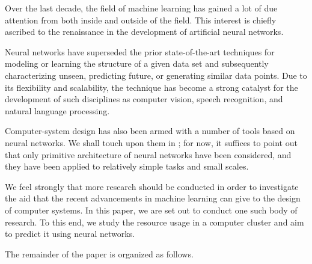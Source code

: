 Over the last decade, the field of machine learning has gained a lot of due
attention from both inside and outside of the field. This interest is chiefly
ascribed to the renaissance in the development of artificial neural networks.

Neural networks have superseded the prior state-of-the-art techniques for
modeling or learning the structure of a given data set and subsequently
characterizing unseen, predicting future, or generating similar data points. Due
to its flexibility and scalability, the technique has become a strong catalyst
for the development of such disciplines as computer vision, speech recognition,
and natural language processing.

Computer-system design has also been armed with a number of tools based on
neural networks. We shall touch upon them in ; for now, it
suffices to point out that only primitive architecture of neural networks have
been considered, and they have been applied to relatively simple tasks and small
scales.

We feel strongly that more research should be conducted in order to investigate
the aid that the recent advancements in machine learning can give to the design
of computer systems. In this paper, we are set out to conduct one such body of
research. To this end, we study the resource usage in a computer cluster and aim
to predict it using neural networks.

The remainder of the paper is organized as follows.
